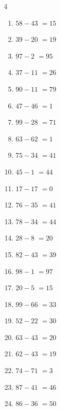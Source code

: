 \begin{multicols}{4}
\begin{enumerate}
  \item $58-43$
        $=15$

  \item $39-20$
        $=19$

  \item $97-2$
        $=95$

  \item $37-11$
        $=26$

  \item $90-11$
        $=79$

  \item $47-46$
        $=1$

  \item $99-28$
        $=71$

  \item $63-62$
        $=1$

  \item $75-34$
        $=41$

  \item $45-1$
        $=44$

  \item $17-17$
        $=0$

  \item $76-35$
        $=41$

  \item $78-34$
        $=44$

  \item $28-8$
        $=20$

  \item $82-43$
        $=39$

  \item $98-1$
        $=97$

  \item $20-5$
        $=15$

  \item $99-66$
        $=33$

  \item $52-22$
        $=30$

  \item $63-43$
        $=20$

  \item $62-43$
        $=19$

  \item $74-71$
        $=3$

  \item $87-41$
        $=46$

  \item $86-36$
        $=50$


\end{enumerate}
\end{multicols}
